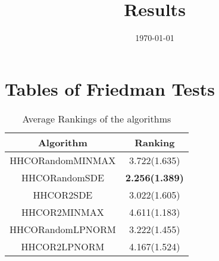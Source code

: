 \documentclass{article}
\title{Results}
\author{}
\date{\today}
\begin{document}
\oddsidemargin 0in \topmargin 0in\maketitle
\section{Tables of Friedman Tests}
\begin{table}[!htp]
\centering
\caption{Average Rankings of the algorithms
}\begin{tabular}{|c|c|}
\hline
Algorithm&Ranking\\
\hline
HHCORandomMINMAX&3.722(1.635)\\\hline
HHCORandomSDE& {\bf 2.256(1.389)}\\\hline
HHCOR2SDE&3.022(1.605)\\\hline
HHCOR2MINMAX&4.611(1.183)\\\hline
HHCORandomLPNORM&3.222(1.455)\\\hline
HHCOR2LPNORM&4.167(1.524)\\\hline
\end{tabular}
\end{table}
\end{document}
